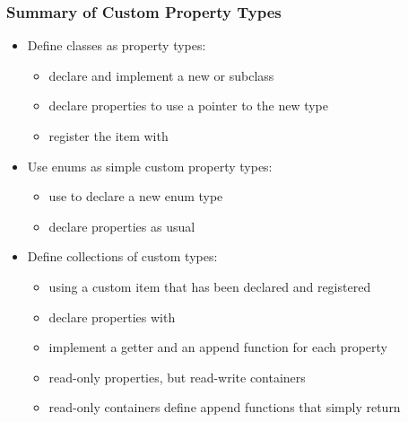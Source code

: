 \begin{slide}[fragile]\frametitle{Summary of Custom Property Types}

\begin{itemize}
\item Define classes as property types:
  \begin{itemize}
  \item declare and implement a new  or  subclass
  \item declare properties to use a pointer to the new type
  \item register the item with 
  \end{itemize}
\vspace*{1em}
\item Use enums as simple custom property types:
  \begin{itemize}
  \item use  to declare a new enum type
  \item declare properties as usual
  \end{itemize}
\vspace*{1em}
\item Define collections of custom types:
  \begin{itemize}
  \item using a custom item that has been declared and registered
  \item declare properties with 
  \item implement a getter and an append function for each property
  \item read-only properties, but read-write containers
  \item read-only containers define append functions that simply return
  \end{itemize}
\end{itemize}

\end{slide}
